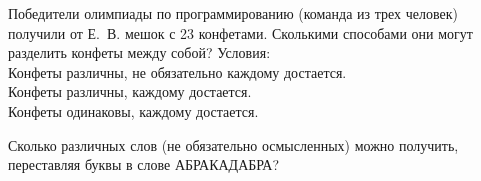 %
%


\begin{problems}

\item
Победители олимпиады по программированию (команда из трех человек) получили от
Е.~В. мешок с 23 конфетами.
Сколькими способами они могут разделить конфеты между собой?
Условия:
\\
\sbp Конфеты различны, не обязательно каждому достается.
\\
\sbp Конфеты различны, каждому достается.
\\
\sbp Конфеты одинаковы, каждому достается.

\item
Сколько различных слов (не обязательно осмысленных) можно получить, переставляя
буквы в слове АБРАКАДАБРА?


\end{problems}
 
